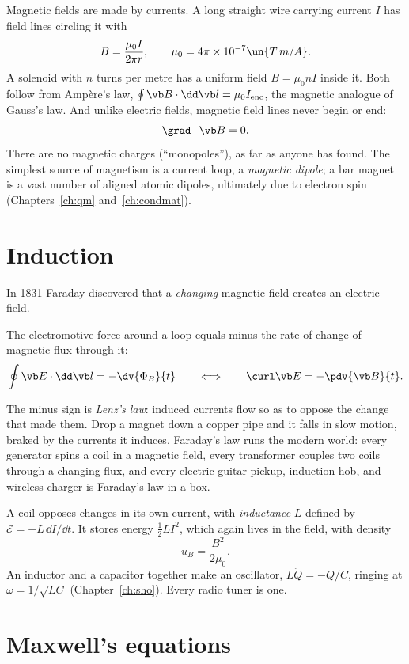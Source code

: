 Magnetic fields are made by currents. A long straight wire carrying current $I$ has field lines circling it with
\[
  B = \frac{\mu_0 I}{2\pi r}, \qquad \mu_0 = 4\pi\times10^{-7}\un{T\,m/A}.
\]
A solenoid with $n$ turns per metre has a uniform field $B = \mu_0 nI$ inside it. Both follow from Amp\`ere's law, $\oint\vb B\cdot\dd\vb l = \mu_0I_{\text{enc}}$, the magnetic analogue of Gauss's law. And unlike electric fields, magnetic field lines never begin or end:
\[
  \grad\cdot\vb B = 0 .
\]
There are no magnetic charges (``monopoles''), as far as anyone has found. The simplest source of magnetism is a current loop, a \emph{magnetic dipole}; a bar magnet is a vast number of aligned atomic dipoles, ultimately due to electron spin (Chapters~\ref{ch:qm} and~\ref{ch:condmat}).

\section{Induction}

In 1831 Faraday discovered that a \emph{changing} magnetic field creates an electric field.

\begin{law}
The electromotive force around a loop equals minus the rate of change of magnetic flux through it:
\[
  \oint\vb E\cdot\dd\vb l = -\dv{\Phi_B}{t}
  \qquad\Longleftrightarrow\qquad
  \curl\vb E = -\pdv{\vb B}{t}.
\]
\end{law}

The minus sign is \emph{Lenz's law}: induced currents flow so as to oppose the change that made them. Drop a magnet down a copper pipe and it falls in slow motion, braked by the currents it induces. Faraday's law runs the modern world: every generator spins a coil in a magnetic field, every transformer couples two coils through a changing flux, and every electric guitar pickup, induction hob, and wireless charger is Faraday's law in a box.

A coil opposes changes in its own current, with \emph{inductance} $L$ defined by $\mathcal{E} = -L\,\dd I/\dd t$. It stores energy $\tfrac12LI^2$, which again lives in the field, with density
\[
  u_B = \frac{B^2}{2\mu_0}.
\]
An inductor and a capacitor together make an oscillator, $L\ddot Q = -Q/C$, ringing at $\omega = 1/\sqrt{LC}$ (Chapter~\ref{ch:sho}). Every radio tuner is one.

\section{Maxwell's equations}

